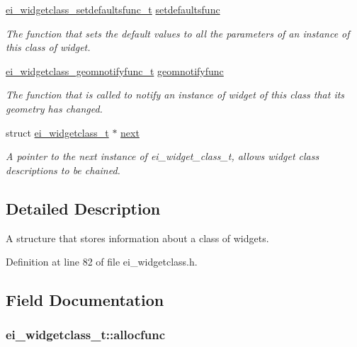 \begin{DoxyCompactItemize}
\hyperlink{ei__widgetclass_8c_a3b190e940c48f6c04c4974b9a3fbfe3f}{ei\-\_\-widgetclass\-\_\-setdefaultsfunc\-\_\-t} \hyperlink{structei__widgetclass__t_a5fec706eefca10172d897cf61b268510}{setdefaultsfunc}
\begin{DoxyCompactList}\small\item\em The function that sets the default values to all the parameters of an instance of this class of widget. \end{DoxyCompactList}\item 
\hyperlink{ei__widgetclass_8c_ac236b1cd658bd8df18a027872fc850eb}{ei\-\_\-widgetclass\-\_\-geomnotifyfunc\-\_\-t} \hyperlink{structei__widgetclass__t_aaf0aa3f54a48a6b3f8b8e12574ede4b7}{geomnotifyfunc}
\begin{DoxyCompactList}\small\item\em The function that is called to notify an instance of widget of this class that its geometry has changed. \end{DoxyCompactList}\item 
struct \hyperlink{structei__widgetclass__t}{ei\-\_\-widgetclass\-\_\-t} $\ast$ \hyperlink{structei__widgetclass__t_aa184e650475ec2451f033858db1876f0}{next}
\begin{DoxyCompactList}\small\item\em A pointer to the next instance of ei\-\_\-widget\-\_\-class\-\_\-t, allows widget class descriptions to be chained. \end{DoxyCompactList}\end{DoxyCompactItemize}


\subsection{Detailed Description}
A structure that stores information about a class of widgets. 

Definition at line 82 of file ei\-\_\-widgetclass.\-h.



\subsection{Field Documentation}
\hypertarget{structei__widgetclass__t_a233446250cdde4347c1381427923d21a}{
\subsubsection[{allocfunc}]{ ei\-\_\-widgetclass\-\_\-t\-::allocfunc}}\label{structei__widgetclass__t_a233446250cdde4347c1381427923d21a}


